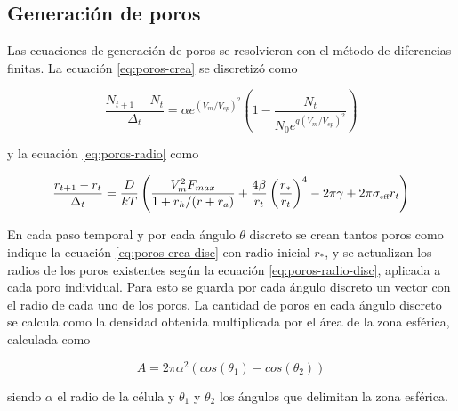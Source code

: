 \documentclass[a4paper,10pt]{article}
\begin{document}
\subsection{Generación de poros}

Las ecuaciones de generación de poros se resolvieron con el método de diferencias finitas. La ecuación \ref{eq:poros-crea} se discretizó como

\begin{equation} \label{eq:poros-crea-disc}
	\frac{N_{t+1} - N_{t}}{\Delta_t} = \alpha e^{(V_m/V_{ep})^2} \left( 1 - \frac{N_{t}}{N_0 e^{q \left(V_m / V_{ep} \right) ^2}} \right)
\end{equation}

y la ecuación \ref{eq:poros-radio} como

\begin{equation} \label{eq:poros-radio-disc}
	\frac{r_{t+1} - r_t}{\Delta_t} = \frac{D}{kT} \left( \frac{V_m^2 F_{max}}{1+r_h / (r+r_a)} + \frac{4 \beta}{r_t} \left(\frac{r_*}{r_t}\right)^4 - 2 \pi \gamma + 2 \pi \sigma_{\textrm{\tiny eff}} r_t \right)
\end{equation}


En cada paso temporal y por cada ángulo $\theta$ discreto se crean tantos poros como indique la ecuación \ref{eq:poros-crea-disc} con radio inicial $r_*$, y se actualizan los radios de los poros existentes según la ecuación \ref{eq:poros-radio-disc}, aplicada a cada poro individual. Para esto se guarda por cada ángulo discreto un vector con el radio de cada uno de los poros. La cantidad de poros en cada ángulo discreto se calcula como la densidad obtenida multiplicada por el área de la zona esférica, calculada como 

\begin{equation}
	A = 2 \pi \alpha^2 (cos(\theta_1) - cos(\theta_2))
\end{equation}

siendo $\alpha$ el radio de la célula y $\theta_1$ y $\theta_2$ los ángulos que delimitan la zona esférica.\\
\end{document}
